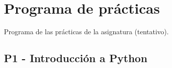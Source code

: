 \documentclass[a4paper,12pt]{article}
\begin{document}
%
%
%
%
%
%

\newpage

\section{Programa de prácticas}

Programa de las prácticas de la asignatura (tentativo).

\subsection{P1 - Introducción a Python}
\end{document}
